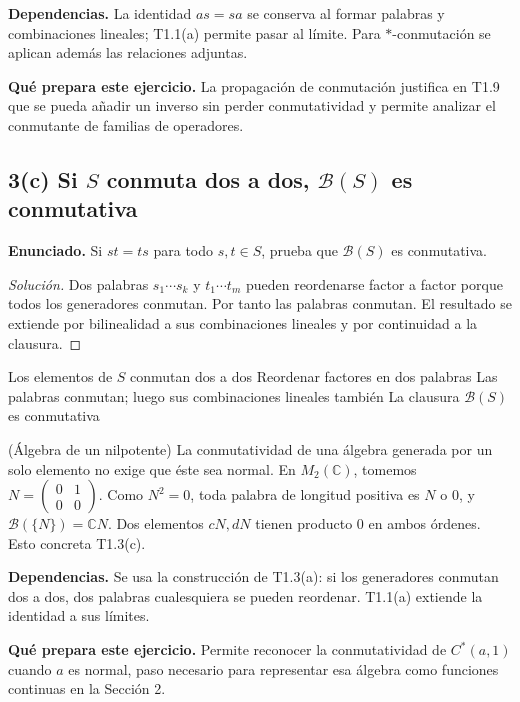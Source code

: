 \noindent\textbf{Dependencias.} La identidad $as=sa$ se conserva al formar palabras y combinaciones lineales; T1.1(a) permite pasar al límite. Para $*$-conmutación se aplican además las relaciones adjuntas.

\noindent\textbf{Qué prepara este ejercicio.} La propagación de conmutación justifica en T1.9 que se pueda añadir un inverso sin perder conmutatividad y permite analizar el conmutante de familias de operadores.

\subsection*{3(c) Si $S$ conmuta dos a dos, $\mathcal B(S)$ es conmutativa}

\noindent\textbf{Enunciado.} Si $st=ts$ para todo $s,t\in S$, prueba que $\mathcal B(S)$ es conmutativa.

\begin{proof}[Solución]
Dos palabras $s_1\cdots s_k$ y $t_1\cdots t_m$ pueden reordenarse factor a factor porque todos
los generadores conmutan. Por tanto las palabras conmutan. El resultado se extiende por bilinealidad
a sus combinaciones lineales y por continuidad a la clausura.
\end{proof}

\proofdiagram
{Los elementos de $S$ conmutan dos a dos}
{Reordenar factores en dos palabras}
{Las palabras conmutan; luego sus combinaciones lineales también}
{La clausura $\mathcal B(S)$ es conmutativa}

\begin{cthejemplo}{(Álgebra de un nilpotente)}
La conmutatividad de una álgebra generada por un solo elemento no exige que éste sea normal.
En $M_2(\mathbb C)$, tomemos $N=\begin{pmatrix}0&1\\0&0\end{pmatrix}$.
Como $N^2=0$, toda palabra de longitud positiva es $N$ o $0$, y
$\mathcal B(\{N\})=\mathbb C N$.
Dos elementos $cN,dN$ tienen producto $0$ en ambos órdenes. Esto concreta T1.3(c).
\end{cthejemplo}

\noindent\textbf{Dependencias.} Se usa la construcción de T1.3(a): si los generadores conmutan dos a dos, dos palabras cualesquiera se pueden reordenar. T1.1(a) extiende la identidad a sus límites.

\noindent\textbf{Qué prepara este ejercicio.} Permite reconocer la conmutatividad de $C^*(a,1)$ cuando $a$ es normal, paso necesario para representar esa álgebra como funciones continuas en la Sección 2.

